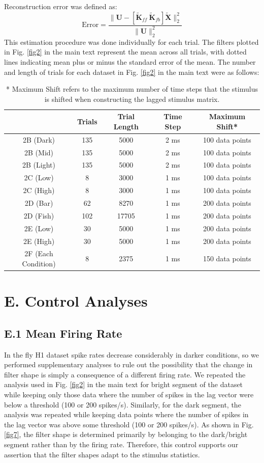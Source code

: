 Reconstruction error was defined as:
\[
\text{Error} = \frac{\|\mathbf{U} - [ \mathbf{\tilde{K}}_{ff} \ \mathbf{\tilde{K}}_{fb}]\mathbf{\tilde{X}}\|_2^2}{\|\mathbf{U}\|_2^2}
\]
This estimation procedure was done individually for each trial. The filters plotted in Fig. \ref{fig2} in the main text represent the mean across all trials, with dotted lines indicating mean plus or minus the standard error of the mean.
The number and length of trials for each dataset in Fig. \ref{fig2} in the main text were as follows:
\begin{table}[h]
\centering
\begin{tabular}{ccccc}
\hline
 & Trials & Trial Length & Time Step & Maximum Shift* \\
\hline
2B (Dark) & 135 & 5000 & 2 ms & 100 data points \\
2B (Mid) & 135 & 5000 & 2 ms & 100 data points \\
2B (Light) & 135 & 5000 & 2 ms & 100 data points \\
2C (Low) & 8 & 3000 & 1 ms & 100 data points \\
2C (High) & 8 & 3000 & 1 ms & 100 data points \\
2D (Bar) & 62 & 8270 & 1 ms & 200 data points \\
2D (Fish) & 102 & 17705 & 1 ms & 200 data points \\
2E (Low) & 30 & 5000 & 1 ms & 200 data points \\
2E (High) & 30 & 5000 & 1 ms & 200 data points \\
2F (Each Condition) & 8 & 2375 & 1 ms & 150 data points \\
\hline
\end{tabular}
\caption{* Maximum Shift refers to the maximum number of time steps that the stimulus is shifted when constructing the lagged stimulus matrix.}
\end{table}

\section*{E. Control Analyses}
\subsection*{E.1 Mean Firing Rate}
In the fly H1 dataset spike rates decrease considerably in darker conditions, so we performed supplementary analyses to rule out the possibility that the change in filter shape is simply a consequence of a different firing rate. We repeated the analysis used in Fig. \ref{fig2} in the main text for bright segment of the dataset while keeping only those data where the number of spikes in the lag vector were below a threshold (100 or 200 spikes/s). Similarly, for the dark segment, the analysis was repeated while keeping data points where the number of spikes in the lag vector was above some threshold (100 or 200 spikes/s). As shown in Fig. \ref{fig7}, the filter shape is determined primarily by belonging to the dark/bright segment rather than by the firing rate. Therefore, this control supports our assertion that the filter shapes adapt to the stimulus statistics.
